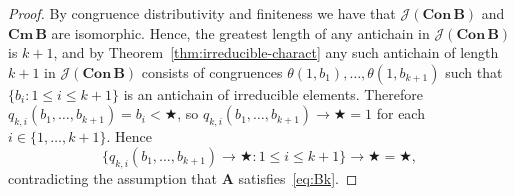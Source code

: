 \documentclass[10pt,a4paper]{amsart}
\def\op{\bigstar}
\def\ra{\rightarrow}
\newcommand{\Cm}[1]{\mathbf{Cm}\, #1}
\newcommand{\Con}[1]{\mathbf{Con}\, #1}
\newcommand{\J}[1]{\mathcal{J}(#1)}
\newcommand{\alg}[1]{\mathbf{#1}}
\begin{document}
\begin{proof}
By congruence distributivity and finiteness we have that
$\J{\Con{\alg{B}}}$ and $\Cm{\alg{B}}$ are isomorphic.
Hence, the greatest length of any antichain in $\J{\Con{\alg{B}}}$ is 
$k+1$, and by Theorem~\ref{thm:irreducible-charact} any such antichain of length
$k+1$ in $\J{\Con{\alg{B}}}$ consists of congruences 
$\theta(1,b_1),\dots,\theta(1,b_{k+1})$ such that 
$\{b_i: 1\leq i\leq k+1\}$ is an antichain of irreducible elements. Therefore
$q_{k,i}(b_1,\dots,b_{k+1}) = b_i<\op$, so 
$q_{k,i}(b_1,\dots,b_{k+1})\ra \op = 1$ for each $i\in\{1,\dots,k+1\}$. Hence
$$
\{q_{k,i}(b_1,\dots,b_{k+1})\ra \op:1\leq i\leq k+1\}\ra \op = \op,
$$
contradicting the assumption that $\alg{A}$ satisfies~\eqref{eq:Bk}.
\end{proof}  
\end{document}
